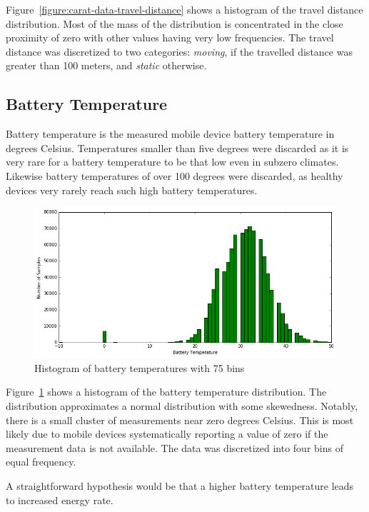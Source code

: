 Figure~\ref{figure:carat-data-travel-distance} shows a histogram of the travel distance distribution. Most of the mass of the distribution is concentrated in the close proximity of zero with other values having very low frequencies. The travel distance was discretized to two categories: \textit{moving}, if the travelled distance was greater than 100 meters, and \textit{static} otherwise.

\subsection{Battery Temperature}  

Battery temperature is the measured mobile device battery temperature in degrees Celsius. Temperatures smaller than five degrees were discarded as it is very rare for a battery temperature to be that low even in subzero climates. Likewise battery temperatures of over 100 degrees were discarded, as healthy devices very rarely reach such high battery temperatures.

\begin{figure}[!htbp]
	\centering
	\includegraphics[width=\textwidth]{images/carat-data/battery_temperature.png}
	\caption{Histogram of battery temperatures with 75 bins}
	\label{figure:carat-data-battery-temperature}
\end{figure}  

Figure~\ref{figure:carat-data-battery-temperature} shows a histogram of the battery temperature distribution. The distribution approximates a normal distribution with some skewedness. Notably, there is a small cluster of measurements near zero degrees Celsius. This is most likely due to mobile devices systematically reporting a value of zero if the measurement data is not available. The data was discretized into four bins of equal frequency.

A straightforward hypothesis would be that a higher battery temperature leads to increased energy rate.


